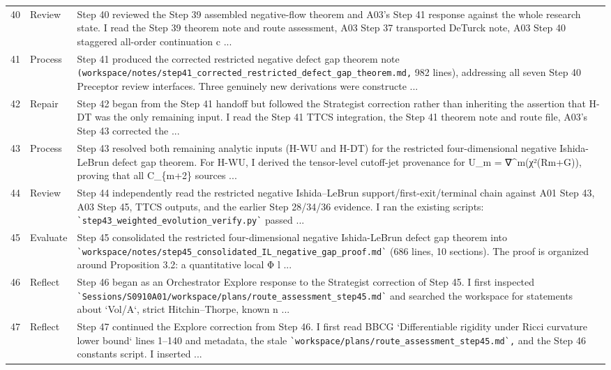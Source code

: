 \documentclass[UTF8,fontset=fandol,zihao=-4]{ctexart}
\begin{document}
\begin{longtable}{r p{} >{\raggedright\arraybackslash}p{}}
40 & Review & Step 40 reviewed the Step 39 assembled negative-flow theorem and A03's Step 41 response against the whole research state. I read the Step 39 theorem note and route assessment, A03 Step 37 transported DeTurck note, A03 Step 40 staggered all-order continuation c ...\\
41 & Process & Step 41 produced the corrected restricted negative defect gap theorem note \nolinkurl{(workspace/notes/step41_corrected_restricted_defect_gap_theorem.md,} 982 lines), addressing all seven Step 40 Preceptor review interfaces. Three genuinely new derivations were constructe ...\\
42 & Repair & Step 42 began from the Step 41 handoff but followed the Strategist correction rather than inheriting the assertion that H-DT was the only remaining input. I read the Step 41 TTCS integration, the Step 41 theorem note and route file, A03's Step 43 corrected the ...\\
43 & Process & Step 43 resolved both remaining analytic inputs (H-WU and H-DT) for the restricted four-dimensional negative Ishida-LeBrun defect gap theorem. For H-WU, I derived the tensor-level cutoff-jet provenance for U\_m = ∇\textasciicircum{}m(χ²(Rm+G)), proving that all C\_\{m+2\} sources  ...\\
44 & Review & Step 44 independently read the restricted negative Ishida--LeBrun support/first-exit/terminal chain against A01 Step 43, A03 Step 45, TTCS outputs, and the earlier Step 28/34/36 evidence. I ran the existing scripts: \nolinkurl{`step43_weighted_evolution_verify.py`} passed ...\\
45 & Evaluate & Step 45 consolidated the restricted four-dimensional negative Ishida-LeBrun defect gap theorem into \nolinkurl{`workspace/notes/step45_consolidated_IL_negative_gap_proof.md`} (686 lines, 10 sections). The proof is organized around Proposition 3.2: a quantitative local Φ l ...\\
46 & Reflect & Step 46 began as an Orchestrator Explore response to the Strategist correction of Step 45. I first inspected \nolinkurl{`Sessions/S0910A01/workspace/plans/route_assessment_step45.md`} and searched the workspace for statements about `Vol/A`, strict Hitchin--Thorpe, known n ...\\
47 & Reflect & Step 47 continued the Explore correction from Step 46. I first read BBCG `Differentiable rigidity under Ricci curvature lower bound` lines 1--140 and metadata, the stale \nolinkurl{`workspace/plans/route_assessment_step45.md`,} and the Step 46 constants script. I inserted ...\\

\end{longtable}
\end{document}
